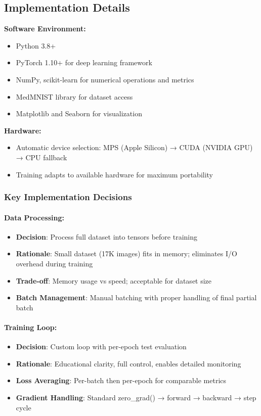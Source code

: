 \documentclass[runningheads]{llncs}
\begin{document}
\subsection{Implementation Details}

\textbf{Software Environment:}
\begin{itemize}
    \item Python 3.8+
    \item PyTorch 1.10+ for deep learning framework
    \item NumPy, scikit-learn for numerical operations and metrics
    \item MedMNIST library for dataset access
    \item Matplotlib and Seaborn for visualization
\end{itemize}

\textbf{Hardware:}
\begin{itemize}
    \item Automatic device selection: MPS (Apple Silicon) → CUDA (NVIDIA GPU) → CPU fallback
    \item Training adapts to available hardware for maximum portability
\end{itemize}

\subsubsection{Key Implementation Decisions}

\paragraph{Data Processing:}
\begin{itemize}
    \item \textbf{Decision}: Process full dataset into tensors before training
    \item \textbf{Rationale}: Small dataset (17K images) fits in memory; eliminates I/O overhead during training
    \item \textbf{Trade-off}: Memory usage vs speed; acceptable for dataset size
    \item \textbf{Batch Management}: Manual batching with proper handling of final partial batch
\end{itemize}

\paragraph{Training Loop:}
\begin{itemize}
    \item \textbf{Decision}: Custom loop with per-epoch test evaluation
    \item \textbf{Rationale}: Educational clarity, full control, enables detailed monitoring
    \item \textbf{Loss Averaging}: Per-batch then per-epoch for comparable metrics
    \item \textbf{Gradient Handling}: Standard zero\_grad() → forward → backward → step cycle
\end{itemize}
\end{document}

